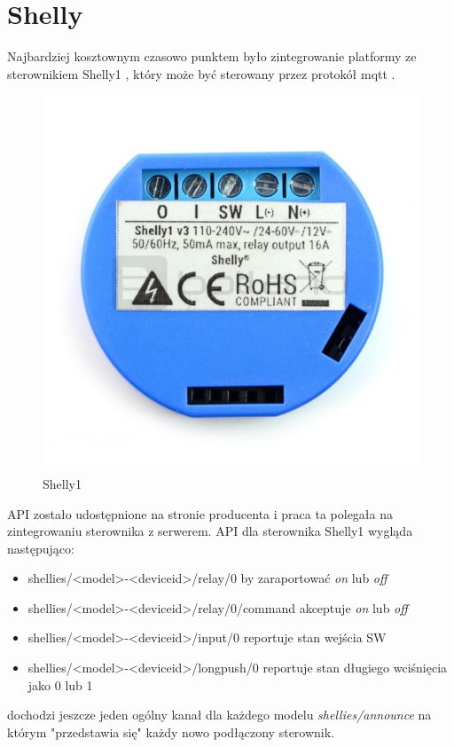 \section{Shelly}
Najbardziej kosztownym czasowo punktem było zintegrowanie platformy ze sterownikiem Shelly1 \cite{shelly}, który może być sterowany przez protokół mqtt \cite{mqtt}. 
\begin{figure}[h]
  \centering
  \includegraphics[width=\linewidth/2]{shelly1.jpg}
  \caption{Shelly1}
  \label{fig:shelly}
\end{figure}
API zostało udostępnione na stronie producenta i praca ta polegała na zintegrowaniu sterownika z serwerem.
API dla sterownika Shelly1 wygląda następująco:
\begin{itemize}
    \item shellies/<model>-<deviceid>/relay/0 by zaraportować \textit{on} lub \textit{off}
    \item shellies/<model>-<deviceid>/relay/0/command akceptuje \textit{on} lub \textit{off}
    \item shellies/<model>-<deviceid>/input/0 reportuje stan wejścia SW
    \item shellies/<model>-<deviceid>/longpush/0 reportuje stan długiego wciśnięcia jako 0 lub 1
\end{itemize}
dochodzi jeszcze jeden ogólny kanał dla każdego modelu \textit{shellies/announce} na którym "przedstawia się" każdy nowo podłączony sterownik.
